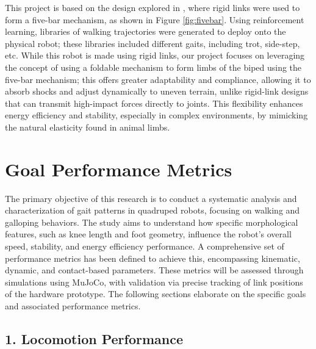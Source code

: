 \documentclass[12pt]{article}
\begin{document}
This project is based on the design explored in \cite{tirumala2019gait}, where rigid links were used to form a five-bar mechanism, as shown in Figure \ref{fig:fivebar}. Using reinforcement learning, libraries of walking trajectories were generated to deploy onto the physical robot; these libraries included different gaits, including trot, side-step, etc. While this robot is made using rigid links, our project focuses on leveraging the concept of using a foldable mechanism to form limbs of the biped using the five-bar mechanism; this offers greater adaptability and compliance, allowing it to absorb shocks and adjust dynamically to uneven terrain, unlike rigid-link designs that can transmit high-impact forces directly to joints. This flexibility enhances energy efficiency and stability, especially in complex environments, by mimicking the natural elasticity found in animal limbs.




\section*{Goal Performance Metrics}

The primary objective of this research is to conduct a systematic analysis and characterization of gait patterns in quadruped robots, focusing on walking and galloping behaviors. The study aims to understand how specific morphological features, such as knee length and foot geometry, influence the robot's overall speed, stability, and energy efficiency performance. A comprehensive set of performance metrics has been defined to achieve this, encompassing kinematic, dynamic, and contact-based parameters. These metrics will be assessed through simulations using MuJoCo, with validation via precise tracking of link positions of the hardware prototype. The following sections elaborate on the specific goals and associated performance metrics.

\subsection*{1. Locomotion Performance}
\end{document}
